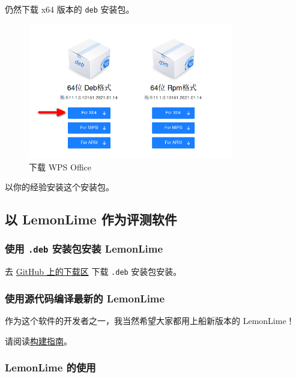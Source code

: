 \documentclass[UTF-8]{ctexart}
\begin{document}
				仍然下载 x64 版本的 \texttt{deb} 安装包。
				
				\begin{figure}[H]
					\centering
					\includegraphics[width=0.8\textwidth]{fig/wps_office_download.png}
					\caption*{下载 WPS Office}
				\end{figure}
				
				以你的经验安装这个安装包。
		
		\newpage
				
		\subsection{以 LemonLime 作为评测软件}
			
			\subsubsection{使用 \texttt{.deb} 安装包安装 LemonLime}
			
				去 \href{https://github.com/Project-LemonLime/Project_LemonLime/releases}{GitHub 上的下载区} 下载 \texttt{.deb} 安装包安装。
			
			\subsubsection{使用源代码编译最新的 LemonLime}
			
				作为这个软件的开发者之一，我当然希望大家都用上船新版本的 LemonLime！
			
				请阅读\href{https://github.com/Project-LemonLime/Project_LemonLime/blob/master/BUILD.md}{构建指南}。
				
			\subsubsection{LemonLime 的使用}
			
\end{document}

